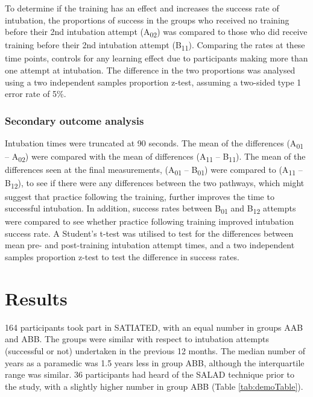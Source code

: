 \documentclass[]{article}
\begin{document}
To determine if the training has an effect and increases the success
rate of intubation, the proportions of success in the groups who
received no training before their 2nd intubation attempt
(A\textsubscript{02}) was compared to those who did receive training
before their 2nd intubation attempt (B\textsubscript{11}). Comparing the
rates at these time points, controls for any learning effect due to
participants making more than one attempt at intubation. The difference
in the two proportions was analysed using a two independent samples
proportion z-test, assuming a two-sided type 1 error rate of 5\%.

\hypertarget{secondary-outcome-analysis}{%
\subsubsection{Secondary outcome
analysis}\label{secondary-outcome-analysis}}

Intubation times were truncated at 90 seconds. The mean of the
differences (A\textsubscript{01} -- A\textsubscript{02}) were compared
with the mean of differences (A\textsubscript{11} --
B\textsubscript{11}). The mean of the differences seen at the final
measurements, (A\textsubscript{01} -- B\textsubscript{01}) were compared
to (A\textsubscript{11} -- B\textsubscript{12}), to see if there were
any differences between the two pathways, which might suggest that
practice following the training, further improves the time to successful
intubation. In addition, success rates between B\textsubscript{01} and
B\textsubscript{12} attempts were compared to see whether practice
following training improved intubation success rate. A Student's t-test
was utilised to test for the differences between mean pre- and
post-training intubation attempt times, and a two independent samples
proportion z-test to test the difference in success rates.

\hypertarget{results-1}{%
\section{Results}\label{results-1}}

164 participants took part in SATIATED, with an equal number in groups
AAB and ABB. The groups were similar with respect to intubation attempts
(successful or not) undertaken in the previous 12 months. The median
number of years as a paramedic was 1.5 years less in group ABB, although
the interquartile range was similar. 36 participants had heard of the
SALAD technique prior to the study, with a slightly higher number in
group ABB (Table \ref{tab:demoTable}).
\end{document}
